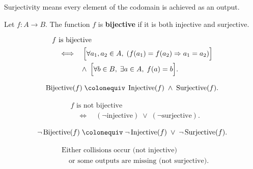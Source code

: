 \begin{remark*}[Interpretation]
Surjectivity means every element of the codomain is achieved as an output.
\end{remark*}


\begin{tcolorbox}[title={Definition --- Bijective}]
\begin{definition}[Bijective]
\label{def:alg-bijective}
Let $f : A \to B$. The function $f$ is \textbf{bijective} if it is both
injective and surjective.
\end{definition}
\end{tcolorbox}

\begin{remark*}
\[
\begin{aligned}
&f \text{ is bijective} \\
&\quad\Longleftrightarrow\quad
\Bigl[\forall a_1,a_2 \in A,\;
(f(a_1)=f(a_2)\Rightarrow a_1=a_2)\Bigr] \\
&\qquad\qquad\land\;
\Bigl[\forall b \in B,\; \exists a \in A,\; f(a)=b\Bigr].
\end{aligned}
\]
\end{remark*}

\begin{remark*}
\[
\operatorname{Bijective}(f)
\;\colonequiv\;
\operatorname{Injective}(f)
\;\land\;
\operatorname{Surjective}(f).
\]
\end{remark*}

\begin{remark*}
\[
\begin{aligned}
&f \text{ is not bijective} \\
&\quad\Longleftrightarrow\quad
(\neg \text{injective}) \;\lor\; (\neg \text{surjective}).
\end{aligned}
\]
\end{remark*}

\begin{remark*}
\[
\neg \operatorname{Bijective}(f)
\;\colonequiv\;
\neg \operatorname{Injective}(f)
\;\lor\;
\neg \operatorname{Surjective}(f).
\]
\end{remark*}

\begin{remark*}
\[
\begin{aligned}
&\text{Either collisions occur (not injective)} \\
&\quad\text{or some outputs are missing (not surjective).}
\end{aligned}
\]
\end{remark*}

